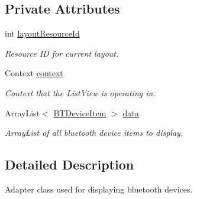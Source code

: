 \subsection*{Private Attributes}
\begin{DoxyCompactItemize}
\item 
\mbox{\label{classcom_1_1jack_1_1motorbikestatistics_1_1_b_t_device_list_adapter_a3f7a9f653fb6a0fcda0a0a61e29d0f06}} 
int \hyperlink{classcom_1_1jack_1_1motorbikestatistics_1_1_b_t_device_list_adapter_a3f7a9f653fb6a0fcda0a0a61e29d0f06}{layout\+Resource\+Id}
\begin{DoxyCompactList}\small\item\em Resource ID for current layout. \end{DoxyCompactList}\item 
\mbox{\label{classcom_1_1jack_1_1motorbikestatistics_1_1_b_t_device_list_adapter_a6e42efbb29008651704bef82263ae838}} 
Context \hyperlink{classcom_1_1jack_1_1motorbikestatistics_1_1_b_t_device_list_adapter_a6e42efbb29008651704bef82263ae838}{context}
\begin{DoxyCompactList}\small\item\em Context that the List\+View is operating in. \end{DoxyCompactList}\item 
\mbox{\label{classcom_1_1jack_1_1motorbikestatistics_1_1_b_t_device_list_adapter_a7e0dfcd0a703aaecf0c0457515b6984f}} 
Array\+List$<$ \hyperlink{classcom_1_1jack_1_1motorbikestatistics_1_1_b_t_device_item}{B\+T\+Device\+Item} $>$ \hyperlink{classcom_1_1jack_1_1motorbikestatistics_1_1_b_t_device_list_adapter_a7e0dfcd0a703aaecf0c0457515b6984f}{data}
\begin{DoxyCompactList}\small\item\em Array\+List of all bluetooth device items to display. \end{DoxyCompactList}\end{DoxyCompactItemize}


\subsection{Detailed Description}
Adapter class used for displaying bluetooth devices. 


